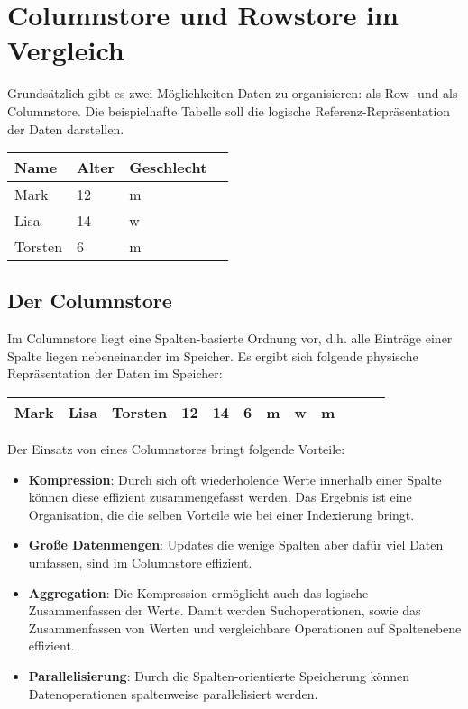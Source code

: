 \chapter{Columnstore und Rowstore im Vergleich}

Grundsätzlich gibt es zwei Möglichkeiten Daten zu organisieren: als Row- und als Columnstore. Die beispielhafte Tabelle soll die logische Referenz-Repräsentation der Daten darstellen.

\begin{center}
    \begin{tabular}{ | l | l | l | l |}
    \hline
    Name & Alter & Geschlecht \\ \hline
    Mark & 12 & m \\ \hline
    Lisa & 14 & w \\ \hline
    Torsten & 6 & m \\ \hline
    \end{tabular}
\end{center}

\section{Der Columnstore}
Im Columnstore liegt eine Spalten-basierte Ordnung vor, d.h. alle Einträge einer Spalte liegen nebeneinander im Speicher. Es ergibt sich folgende physische Repräsentation der Daten im Speicher: 

\begin{center}
    \begin{tabular}{ | l | l | l | l | l | l | l | l | l | l | l | l |}
    \hline
    Mark & Lisa & Torsten & 12 & 14 & 6 & m & w & m \\ \hline
    \end{tabular}
\end{center}

Der Einsatz von eines Columnstores bringt folgende Vorteile: 

\begin{itemize}
	\item \textbf{Kompression}: Durch sich oft wiederholende Werte innerhalb einer Spalte können diese effizient zusammengefasst werden. Das Ergebnis ist eine Organisation, die die selben Vorteile wie bei einer Indexierung bringt. 
    \item \textbf{Große Datenmengen}: Updates die wenige Spalten aber dafür viel Daten umfassen, sind im Columnstore effizient. 
	\item \textbf{Aggregation}: Die Kompression ermöglicht auch das  logische Zusammenfassen der Werte. Damit werden Suchoperationen, sowie das Zusammenfassen von Werten und vergleichbare Operationen auf Spaltenebene effizient. 
    \item \textbf{Parallelisierung}: Durch die Spalten-orientierte Speicherung können Datenoperationen spaltenweise parallelisiert werden. 
\end{itemize}


